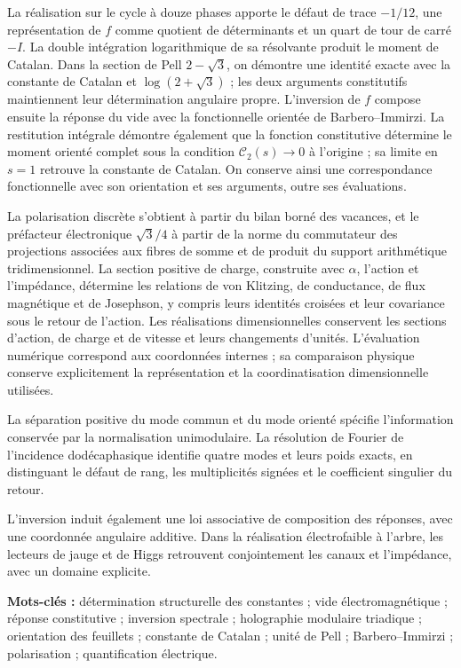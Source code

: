 La réalisation sur le cycle à douze phases apporte le défaut de trace
$-1/12$, une représentation de $f$ comme quotient de déterminants et un quart de tour
de carré $-I$. La double intégration logarithmique de sa résolvante
produit le moment de Catalan. Dans la section de Pell $2-\sqrt3$, on
démontre une identité exacte avec la constante de Catalan et
$\log(2+\sqrt3)$ ; les deux arguments constitutifs maintiennent leur
détermination angulaire propre. L’inversion de $f$ compose ensuite la
réponse du vide avec la fonctionnelle orientée de Barbero--Immirzi.
La restitution intégrale démontre également que la fonction constitutive
détermine le moment orienté complet sous la condition
$\mathcal C_2(s)\to0$ à l’origine ; sa limite en $s=1$ retrouve
la constante de Catalan. On conserve ainsi une correspondance fonctionnelle
avec son orientation et ses arguments, outre ses évaluations.

La polarisation discrète s’obtient à partir du bilan borné des vacances,
et le préfacteur électronique $\sqrt3/4$ à partir de la norme du commutateur des
projections associées aux fibres de somme et de produit du support
arithmétique tridimensionnel. La section
positive de charge, construite avec $\alpha$, l’action et l’impédance,
détermine les relations de von Klitzing, de conductance, de flux magnétique
et de Josephson, y compris leurs identités croisées et leur covariance sous
le retour de l’action. Les réalisations dimensionnelles conservent les
sections d’action, de charge et de vitesse et leurs changements d’unités. L’évaluation
numérique correspond aux coordonnées internes ;
sa comparaison physique conserve explicitement la représentation et la
coordinatisation dimensionnelle utilisées.

La séparation positive du mode commun et du mode orienté spécifie
l’information conservée par la normalisation unimodulaire. La résolution
de Fourier de l’incidence dodécaphasique identifie quatre modes et
leurs poids exacts, en distinguant le défaut de rang, les multiplicités
signées et le coefficient singulier du retour.

L’inversion induit également une loi associative de composition des
réponses, avec une coordonnée angulaire additive. Dans la réalisation
électrofaible à l’arbre, les lecteurs de jauge et de Higgs retrouvent
conjointement les canaux et l’impédance, avec un domaine explicite.

\smallskip
\noindent\textbf{Mots-clés :} détermination structurelle des constantes ;
vide électromagnétique ; réponse constitutive ; inversion spectrale ;
holographie modulaire triadique ; orientation des feuillets ; constante de Catalan ;
unité de Pell ; Barbero--Immirzi ; polarisation ; quantification électrique.
\par\endgroup
